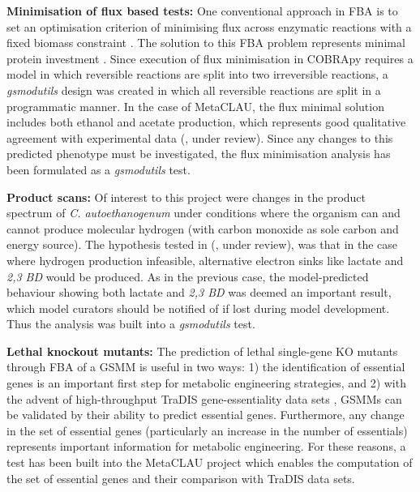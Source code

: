 \documentclass[journal=asbcd6]{achemso}
\begin{document}
\textbf{Minimisation of flux based tests:}
One conventional approach in FBA is to set an optimisation criterion of minimising flux across enzymatic reactions with a fixed biomass constraint \cite{holzhutter2006thegeneralised}. 
The solution to this FBA problem represents minimal protein investment \cite{holzhutter2006thegeneralised}.
Since execution of flux minimisation in COBRApy requires a model in which reversible reactions are split into two irreversible reactions, a \textit{gsmodutils} design was created in which all reversible reactions are split in a programmatic manner.
In the case of MetaCLAU, the flux minimal solution includes both ethanol and acetate production, which represents good qualitative agreement with experimental data (\cite{norman2018progress}, under review).
Since any changes to this predicted phenotype must be investigated, the flux minimisation analysis has been formulated as a \textit{gsmodutils} test.

\textbf{Product scans:}
Of interest to this project were changes in the product spectrum of \textit{C. autoethanogenum} under conditions where the organism can and cannot produce molecular hydrogen (with carbon monoxide as sole carbon and energy source).
The hypothesis tested in (\cite{norman2018progress}, under review), was that in the case where hydrogen production infeasible, alternative electron sinks like lactate and \textit{2,3 BD} would be produced.
As in the previous case, the model-predicted behaviour showing both lactate and \textit{2,3 BD} was deemed an important result, which model curators should be notified of if lost during model development.
Thus the analysis was built into a \textit{gsmodutils} test.

\textbf{Lethal knockout mutants:} 
The prediction of lethal single-gene KO mutants through FBA of a GSMM is useful in two ways: 
1) the identification of essential genes is an important first step for metabolic engineering strategies, 
and 2) with the advent of high-throughput TraDIS gene-essentiality data sets \cite{langridge2009simultaneous}, GSMMs can be validated by their ability to predict essential genes.
Furthermore, any change in the set of essential genes (particularly an increase in the number of essentials) represents important information for metabolic engineering.
For these reasons, a test has been built into the MetaCLAU project which enables the computation of the set of essential genes and their comparison with TraDIS data sets.
\end{document}
